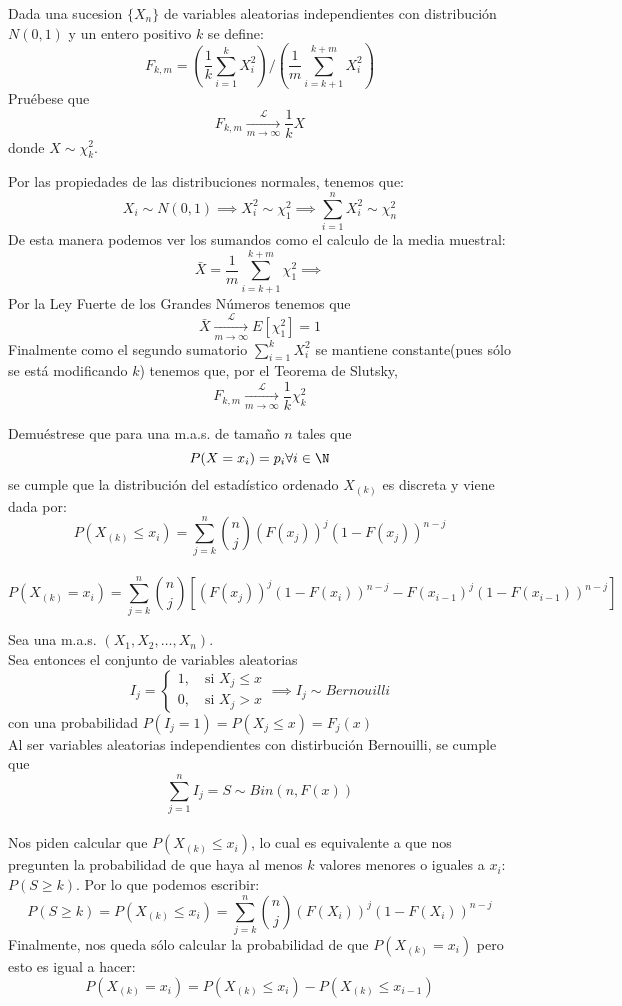\begin{problem}{2.4}
Dada una sucesion $\{X_n\}$ de variables aleatorias independientes con distribución $N(0,1)$ y un entero positivo $k$ se define:
$$F_{k,m} = \left(\frac{1}{k}\sum_{i = 1}^k X_i^2 \right) / \left(\frac{1}{m}\sum_{i = k+1}^{k+m}X_i^2\right)$$
Pruébese que
\[
	F_{k,m} \xrightarrow[m \to \infty]{\mathcal{L}} \frac{1}{k} X
\]
donde \( X \sim \chi^2_k \).
\end{problem}
\begin{sol}
	Por las propiedades de las distribuciones normales, tenemos que: $$X_i \sim N(0,1) \implies X_i^2 \sim \chi^2_1 \implies \sum_{i = 1}^{n} X_i^2 \sim \chi_n^2$$
	De esta manera podemos ver los sumandos como el calculo de la media muestral: $$\bar{X} = \frac{1}{m} \sum_{i = k+1}^{k+m} \chi^2_1 \implies $$ Por la Ley Fuerte de los Grandes Números tenemos que $$\bar{X} \xrightarrow[m \to \infty]{\mathcal{L}} E[\chi^2_1] = 1$$
	Finalmente como el segundo sumatorio $\sum_{i = 1}^{k} X_i^2$ se mantiene constante(pues sólo se está modificando $k$) tenemos que, por el Teorema de Slutsky, $$F_{k,m} \xrightarrow[m \to \infty]{\mathcal{L}} \frac{1}{k} \chi_k^2$$
\end{sol}
\begin{problem}{2.5}
Demuéstrese que para una m.a.s. de tamaño $n$ tales que $$P(X = x_i) = p_i \forall i \in \N$$ se cumple que la distribución del estadístico ordenado $X_{(k)}$ es discreta y viene dada por:
$$P(X_{(k)} \leq x_i) = \sum_{j = k}^{n} \binom{n}{j} (F(x_j))^j(1-F(x_j))^{n-j}$$
\\
$$P(X_{(k)} = x_i) = \sum_{j = k}^{n} \binom{n}{j}[(F(x_j))^j(1 - F(x_i))^{n-j} - F(x_{i-1})^j(1 - F(x_{i-1}))^{n-j}]$$
\end{problem}
\begin{sol}
	Sea una m.a.s. $\left(X_1, X_2, \ldots, X_n\right)$. \\Sea entonces el conjunto de variables aleatorias $$I_j = \begin{cases} 1, \quad \text{si } X_j \leq x \\ 0, \quad \text{si } X_j > x \end{cases} \implies I_j \sim Bernouilli$$ con una probabilidad $P(I_j = 1) = P(X_j \leq x) = F_j(x)$\\ Al ser variables aleatorias independientes con distirbución Bernouilli, se cumple que $$\sum_{j = 1}^{n} I_j = S \sim Bin(n, F(x))$$\\
	Nos piden calcular que $P(X_{(k)} \leq x_i)$, lo cual es equivalente a que nos pregunten la probabilidad de que haya al menos $k$ valores menores o iguales a $x_i$: $P(S \geq k)$. Por lo que podemos escribir:
	$$P(S \geq k) = P(X_{(k)} \leq x_i) = \sum_{j = k}^{n} \binom{n}{j}(F(X_i))^j(1 - F(X_i))^{n-j}$$
	Finalmente, nos queda sólo calcular la probabilidad de que $P(X_{(k)} = x_i)$ pero esto es igual a hacer:
	$$P(X_{(k)} = x_i) = P(X_{(k)} \leq x_i) - P(X_{(k)} \leq x_{i-1})$$
\end{sol}